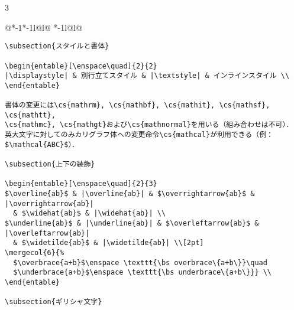 \documentclass[10pt,a4paper,landscape,dvipdfmx]{jarticle}
\makeatletter
\def\set@etsep#1#2{\def\etcolsep{#1}\def\etitemsep{#2}}
\newenvironment{entable}[3][\quad\qquad]{%
  \set@etsep#1\relax\relax
  \begin{tabular}{%
    @{}*{\the\numexpr#3-1}{*{\the\numexpr#2-1}{l@{\etcolsep}}l@{\etitemsep}}%
    *{\the\numexpr#2-1}{l@{\etcolsep}}l@{}}}{%
  \end{tabular}}
\newcommand{\mergecol}[2]{\multicolumn{#1}{@{}l@{}}{#2}}
\newcommand*\eghostguarded{%
  \ifmmode \expandafter\@firstofone
  \else \expandafter\pxqgg@eghostguarded@a
  \fi}
\def\pxqgg@eghostguarded@a#1{%
  {\pxqgg@TI\pxqgg@cwm}%
  #1%
  {\pxqgg@TI\pxqgg@cwm}}
\newcommand{\codefont}{\ttfamily\gtfamily}
\newcommand{\cs}[1]{\eghostguarded{{\codefont \bs #1}}}
\makeatother
\begin{document}
\begin{multicols}{3}
\begin{entable}[\enspace]{2}{1}
\begin{verbatim}
\subsection{スタイルと書体}

\begin{entable}[\enspace\quad]{2}{2}
|\displaystyle| & 別行立てスタイル & |\textstyle| & インラインスタイル \\
\end{entable}

書体の変更には\cs{mathrm}, \cs{mathbf}, \cs{mathit}, \cs{mathsf}, \cs{mathtt},
\cs{mathmc}, \cs{mathgt}および\cs{mathnormal}を用いる（組み合わせは不可）．
英大文字に対してのみカリグラフ体への変更命令\cs{mathcal}が利用できる（例：$\mathcal{ABC}$）．

\subsection{上下の装飾}

\begin{entable}[\enspace\quad]{2}{3}
$\overline{ab}$ & |\overline{ab}| & $\overrightarrow{ab}$ & |\overrightarrow{ab}|
  & $\widehat{ab}$ & |\widehat{ab}| \\
$\underline{ab}$ & |\underline{ab}| & $\overleftarrow{ab}$ & |\overleftarrow{ab}|
  & $\widetilde{ab}$ & |\widetilde{ab}| \\[2pt]
\mergecol{6}{%
  $\overbrace{a+b}$\enspace \texttt{\bs overbrace\{a+b\}}\quad
  $\underbrace{a+b}$\enspace \texttt{\bs underbrace\{a+b\}}} \\
\end{entable}

\subsection{ギリシャ文字}


\end{verbatim}
\end{entable}
\end{multicols}
\end{document}

